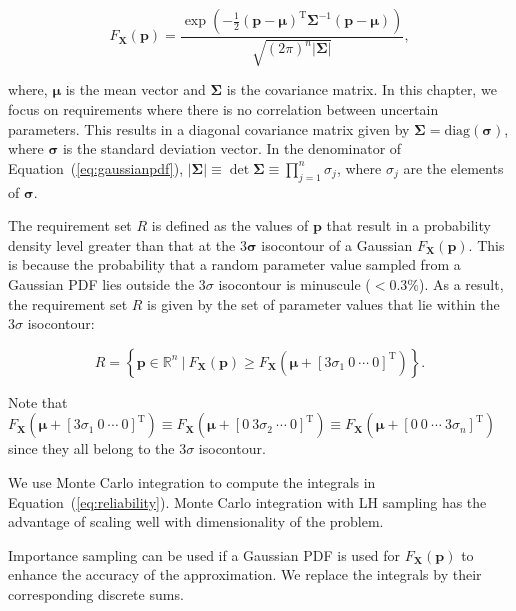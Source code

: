 \begin{equation} \label{eq:gaussianpdf}
	F_\mathbf{X}(\mathbf{p})={\frac {\exp \left(-{\frac {1}{2}}({\mathbf {p} }-{\boldsymbol {\mu }})^{\mathrm {T} }{\boldsymbol {\Sigma }}^{-1}({\mathbf {p} }-{\boldsymbol {\mu }})\right)}{\sqrt {(2\pi )^{n}|{\boldsymbol {\Sigma }}|}}},
\end{equation}

where, $\boldsymbol{\mu}$ is the mean vector and $\boldsymbol{\Sigma}$ is the covariance matrix. In this chapter, we focus on requirements where there is no correlation between uncertain parameters. This results in a diagonal covariance matrix given by $\boldsymbol{\Sigma} = \mathrm{diag}\left(\boldsymbol{\sigma}\right)$, where $\boldsymbol{\sigma}$ is the standard deviation vector. In the denominator of Equation~(\ref{eq:gaussianpdf}), $|{\boldsymbol {\Sigma }}|\equiv \det {\boldsymbol {\Sigma }} \equiv \prod\limits_{j=1}^{n} \sigma_j$, where $\sigma_j$ are the elements of $\boldsymbol{\sigma}$.

The requirement set $R$ is defined as the values of $\mathbf{p}$ that result in a probability density level greater than that at the $3 \boldsymbol{\sigma}$ isocontour of a Gaussian $F_\mathbf{X}(\mathbf{p})$. This is because the probability that a random parameter value sampled from a Gaussian \ac{PDF} lies outside the $3\sigma$ isocontour is minuscule ($<0.3\%$). As a result, the requirement set $R$ is given by the set of parameter values that lie within the $3\sigma$ isocontour:

\begin{equation} \label{eq:requirementsetgaussian}
	\textit{R} = \left\{\mathbf{p} \in \mathbb{R}^n~|~F_\mathbf{X}(\mathbf{p}) \geq F_\mathbf{X}(\boldsymbol{\mu} + \left[3\sigma_1~0~\cdots~0\right]^\mathrm{T}) \right\}.
\end{equation}

Note that $F_\mathbf{X}(\boldsymbol{\mu} + \left[3\sigma_1~0~\cdots~0\right]^\mathrm{T}) \equiv F_\mathbf{X}(\boldsymbol{\mu} + \left[0~3\sigma_2~\cdots~0\right]^\mathrm{T}) \equiv F_\mathbf{X}(\boldsymbol{\mu} + \left[0~0~\cdots~3\sigma_n\right]^\mathrm{T})$ since they all belong to the $3\sigma$ isocontour.

We use Monte Carlo integration to compute the integrals in Equation~(\ref{eq:reliability}). Monte Carlo integration with \ac{LH} sampling has the advantage of scaling well with dimensionality of the problem.

Importance sampling can be used if a Gaussian \ac{PDF} is used for $F_\mathbf{X}(\mathbf{p})$ to enhance the accuracy of the approximation. We replace the integrals by their corresponding discrete sums.

